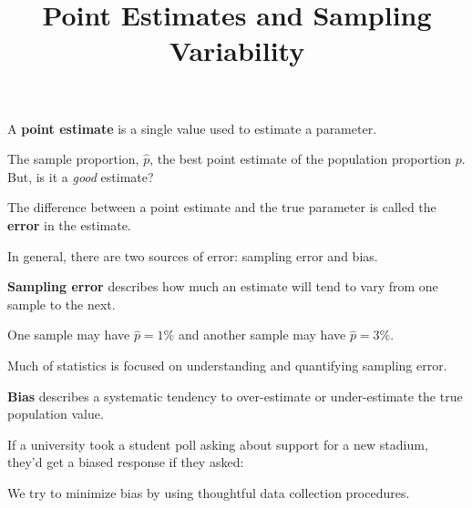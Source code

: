 \documentclass{beamer}
\title[MA205 - Section 5.1]{Point Estimates and Sampling Variability}
\begin{document}
\begin{frame}
\titlepage
\end{frame}

\begin{frame}
  \begin{definition}
    A \textbf{point estimate} is a single value used to estimate a parameter.
  \end{definition}\pause

  \begin{note}
    The sample proportion, $\hat{p}$, the best point estimate of the population proportion $p$. But, is it a \emph{good} estimate?
  \end{note}\pause

  \begin{definition}
    The difference between a point estimate and the true parameter is called the \textbf{error} in the estimate.
  \end{definition}\pause

  \begin{note}
    In general, there are two sources of error: sampling error and bias.
  \end{note}
\end{frame}

\begin{frame}
  \begin{definition}
    \textbf{Sampling error} describes how much an estimate will tend to vary from one sample to the next.
  \end{definition}\pause

  \begin{example}
    One sample may have $\hat{p}=1\%$ and another sample may have $\hat{p}=3\%$.
  \end{example}\pause

  \begin{note}
    Much of statistics is focused on understanding and quantifying sampling error.
  \end{note}
\end{frame}

\begin{frame}
  \begin{definition}
    \textbf{Bias} describes a systematic tendency to over-estimate or under-estimate the true population value.
  \end{definition}\pause

  \begin{example}
    If a university took a student poll asking about support for a new stadium, they'd get a biased response if they asked:

    \vspace{-2.5mm}
    \begin{center}\small
    \end{center}
  \end{example}\pause

  \begin{note}
    We try to minimize bias by using thoughtful data collection procedures.
  \end{note}
\end{frame}
\end{document}
